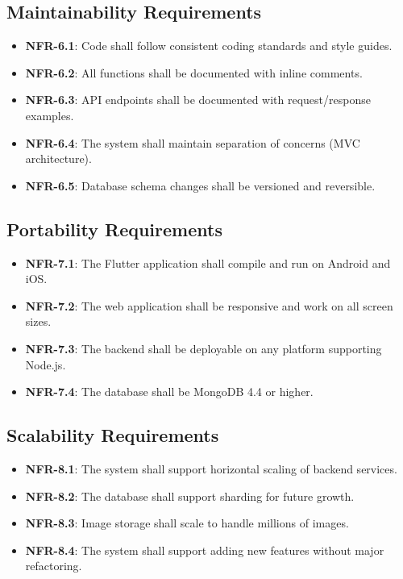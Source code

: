 \documentclass[12pt,a4paper]{article}
\begin{document}
\subsection{Maintainability Requirements}
\begin{itemize}
    \item \textbf{NFR-6.1}: Code shall follow consistent coding standards and style guides.
    \item \textbf{NFR-6.2}: All functions shall be documented with inline comments.
    \item \textbf{NFR-6.3}: API endpoints shall be documented with request/response examples.
    \item \textbf{NFR-6.4}: The system shall maintain separation of concerns (MVC architecture).
    \item \textbf{NFR-6.5}: Database schema changes shall be versioned and reversible.
\end{itemize}

\subsection{Portability Requirements}
\begin{itemize}
    \item \textbf{NFR-7.1}: The Flutter application shall compile and run on Android and iOS.
    \item \textbf{NFR-7.2}: The web application shall be responsive and work on all screen sizes.
    \item \textbf{NFR-7.3}: The backend shall be deployable on any platform supporting Node.js.
    \item \textbf{NFR-7.4}: The database shall be MongoDB 4.4 or higher.
\end{itemize}

\subsection{Scalability Requirements}
\begin{itemize}
    \item \textbf{NFR-8.1}: The system shall support horizontal scaling of backend services.
    \item \textbf{NFR-8.2}: The database shall support sharding for future growth.
    \item \textbf{NFR-8.3}: Image storage shall scale to handle millions of images.
    \item \textbf{NFR-8.4}: The system shall support adding new features without major refactoring.
\end{itemize}
\end{document}
